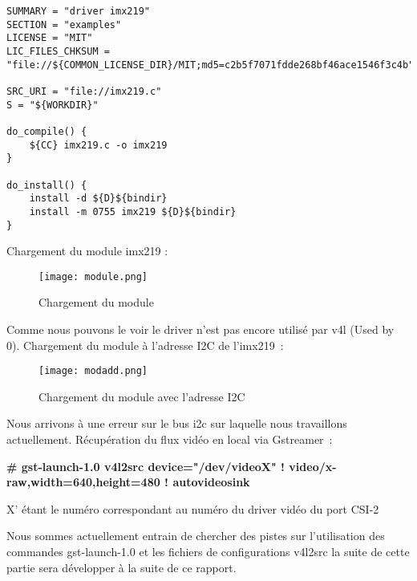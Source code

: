 \clearpage

\begin{lstlisting}
SUMMARY = "driver imx219"
SECTION = "examples"
LICENSE = "MIT"
LIC_FILES_CHKSUM = "file://${COMMON_LICENSE_DIR}/MIT;md5=c2b5f7071fdde268bf46ace1546f3c4b"
    
SRC_URI = "file://imx219.c"
S = "${WORKDIR}"
    
do_compile() {
    ${CC} imx219.c -o imx219
}
    
do_install() {
    install -d ${D}${bindir}
    install -m 0755 imx219 ${D}${bindir}
}
\end{lstlisting}

Chargement du module imx219 :

\begin{figure}[th]
    \centering
    \texttt{[image: module.png]}
    \decoRule
    \caption{Chargement du module}  \label{fig:mod}   
\end{figure}

Comme nous pouvons le voir le driver n’est pas encore utilisé par v4l (Used by 0).
Chargement du module à l’adresse I2C de l’imx219 :

\begin{figure}[th]
    \centering
    \texttt{[image: modadd.png]}
    \decoRule
    \caption{Chargement du module avec l'adresse I2C}  \label{fig:modadd}   
\end{figure}

Nous arrivons à une erreur sur le bus i2c sur laquelle nous travaillons actuellement.
Récupération du flux vidéo en local via Gstreamer :

\textbf{\# gst-launch-1.0 v4l2src device="/dev/videoX" ! video/x-raw,width=640,height=480 ! autovideosink}

X’ étant le numéro correspondant au numéro du driver vidéo du port CSI-2

Nous sommes actuellement entrain de chercher des pistes sur l’utilisation des commandes
gst-launch-1.0 et les fichiers de configurations v4l2src la suite de cette partie sera
développer à la suite de ce rapport. 

